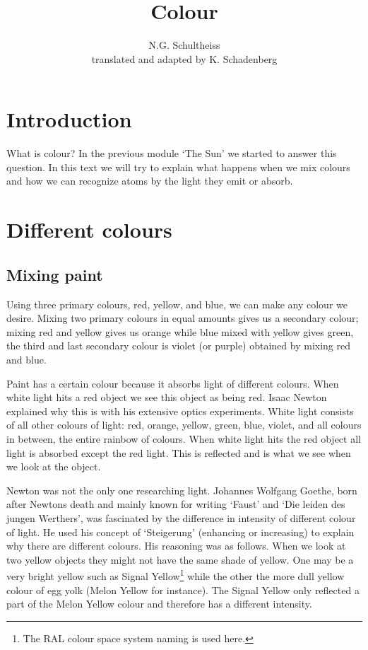 \documentclass[12pt,a4paper]{article}
\author{N.G. Schultheiss \\ translated and adapted by K. Schadenberg}
\date{}
\title{Colour}
\numberwithin{equation}{section}
\numberwithin{figure}{section}
\numberwithin{table}{section}
\begin{document}
\maketitle

\section{Introduction}
What is colour? In the previous module `The Sun' we started to answer this question. In this text we will try to explain what happens when we mix colours and how we can recognize atoms by the light they emit or absorb.

\section{Different colours}
\subsection{Mixing paint}
Using three primary colours, red, yellow, and blue, we can make any colour we desire. Mixing two primary colours in equal amounts gives us a secondary colour; mixing red and yellow gives us orange while blue mixed with yellow gives green, the third and last secondary colour is violet (or purple) obtained by mixing red and blue.

Paint has a certain colour because it absorbs light of different colours. When white light hits a red object we see this object as being red. Isaac Newton explained why this is with his extensive optics experiments. White light consists of all other colours of light: red, orange, yellow, green, blue, violet, and all colours in between, the entire rainbow of colours. When white light hits the red object all light is absorbed except the red light. This is reflected and is what we see when we look at the object.

Newton was not the only one researching light. Johannes Wolfgang Goethe, born after Newtons death and mainly known for writing `Faust' and `Die leiden des jungen Werthers',  was fascinated by the difference in intensity of different colour of light. He used his concept of `Steigerung' (enhancing or increasing) to explain why there are different colours. His reasoning was as follows. When we look at two yellow objects they might not have the same shade of yellow. One may be a very bright yellow such as Signal Yellow\footnote{The RAL colour space system naming is used here.} while the other the more dull yellow colour of egg yolk (Melon Yellow for instance). The Signal Yellow only reflected a part of the Melon Yellow colour and therefore has a different intensity.
\end{document}
